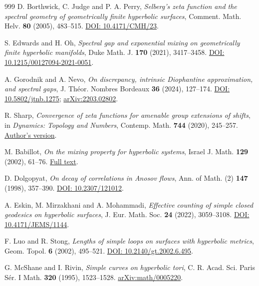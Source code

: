 \documentclass[11pt,a4paper]{article}
\numberwithin{equation}{section}
\theoremstyle{definition}
\theoremstyle{remark}
\begin{document}
\begin{thebibliography}{999}
D. Borthwick, C. Judge and P. A. Perry,
\emph{Selberg's zeta function and the spectral geometry of
geometrically finite hyperbolic surfaces},
Comment. Math. Helv. \textbf{80} (2005), 483--515.
\href{https://doi.org/10.4171/CMH/23}{DOI: 10.4171/CMH/23}.

S. Edwards and H. Oh,
\emph{Spectral gap and exponential mixing on geometrically finite
hyperbolic manifolds},
Duke Math. J. \textbf{170} (2021), 3417--3458.
\href{https://doi.org/10.1215/00127094-2021-0051}{DOI: 10.1215/00127094-2021-0051}.

A. Gorodnik and A. Nevo,
\emph{On discrepancy, intrinsic Diophantine approximation, and spectral gaps},
J. Th\'eor. Nombres Bordeaux \textbf{36} (2024), 127--174.
\href{https://doi.org/10.5802/jtnb.1275}{DOI: 10.5802/jtnb.1275};
\href{https://arxiv.org/abs/2203.02802}{arXiv:2203.02802}.

R. Sharp,
\emph{Convergence of zeta functions for amenable group extensions of shifts},
in \emph{Dynamics: Topology and Numbers}, Contemp. Math. \textbf{744}
(2020), 245--257.
\href{https://warwick.ac.uk/fac/sci/maths/people/staff/richard_sharp/p2/zeta-infinite-convergence-revised.pdf}{Author's version}.

M. Babillot,
\emph{On the mixing property for hyperbolic systems},
Israel J. Math. \textbf{129} (2002), 61--76.
\href{https://www.math.utah.edu/~chaika/Babillot-Mixing}{Full text}.

D. Dolgopyat,
\emph{On decay of correlations in Anosov flows},
Ann. of Math. (2) \textbf{147} (1998), 357--390.
\href{https://doi.org/10.2307/121012}{DOI: 10.2307/121012}.

A. Eskin, M. Mirzakhani and A. Mohammadi,
\emph{Effective counting of simple closed geodesics on hyperbolic surfaces},
J. Eur. Math. Soc. \textbf{24} (2022), 3059--3108.
\href{https://doi.org/10.4171/JEMS/1144}{DOI: 10.4171/JEMS/1144}.

F. Luo and R. Stong,
\emph{Lengths of simple loops on surfaces with hyperbolic metrics},
Geom. Topol. \textbf{6} (2002), 495--521.
\href{https://doi.org/10.2140/gt.2002.6.495}{DOI: 10.2140/gt.2002.6.495}.

G. McShane and I. Rivin,
\emph{Simple curves on hyperbolic tori},
C. R. Acad. Sci. Paris S\'er. I Math. \textbf{320} (1995), 1523--1528.
\href{https://arxiv.org/abs/math/0005220}{arXiv:math/0005220}.


\end{thebibliography}
\end{document}
